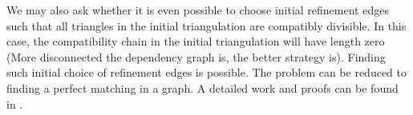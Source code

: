     We may also ask whether it is even possible to choose initial refinement edges such that all triangles in the initial triangulation are compatibly divisible. In this case, the compatibility chain in the initial triangulation will have length zero (More disconnected the dependency graph is, the better strategy is).
    Finding such initial choice of refinement edges is possible. The problem can be reduced to finding a perfect matching in a graph. A detailed work and proofs can be found in \cite{mitchell1988unified,mitchell1991adaptive,mitchell201630}.
    

